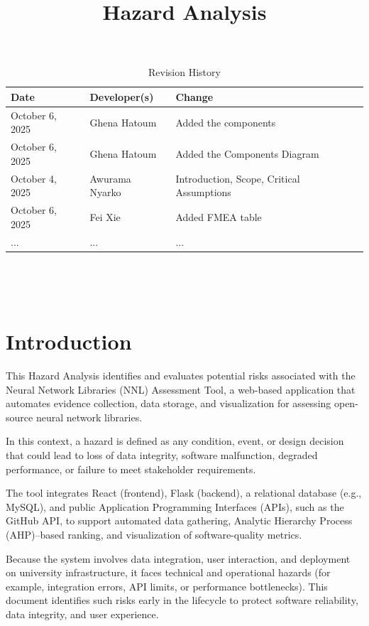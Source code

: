 \documentclass{article}
\title{Hazard Analysis\\\progname}
\author{\authname}
\date{}
\begin{document}
\maketitle
\thispagestyle{empty}


\begin{table}[hp]
\caption{Revision History} \label{TblRevisionHistory}
\begin{tabularx}{\textwidth}{llX}
\toprule
\textbf{Date} & \textbf{Developer(s)} & \textbf{Change}\\
\midrule
October 6, 2025  & Ghena Hatoum & Added the components\\
October 6, 2025  & Ghena Hatoum & Added the Components Diagram\\
October 4, 2025 & Awurama Nyarko & Introduction, Scope, Critical Assumptions\\
October 6, 2025 & Fei Xie & Added FMEA table\\
... & ... & ...\\
\bottomrule
\end{tabularx}
\end{table}

~\newpage

\tableofcontents

~\newpage


\section{Introduction}


This Hazard Analysis identifies and evaluates potential risks associated with
the Neural Network Libraries (NNL) Assessment Tool, a web-based application that
automates evidence collection, data storage, and visualization for assessing
open-source neural network libraries. 

In this context, a hazard is defined as any condition, event, or design
decision that could lead to loss of data integrity, software malfunction,
degraded performance, or failure to meet stakeholder requirements.

The tool integrates React (frontend), Flask (backend), a relational database
(e.g., MySQL), and public Application Programming Interfaces (APIs), such as the
GitHub API, to support automated data gathering, Analytic Hierarchy Process
(AHP)--based ranking, and visualization of software-quality metrics.

Because the system involves data integration, user interaction, and deployment
on university infrastructure, it faces technical and operational hazards (for
example, integration errors, API limits, or performance bottlenecks). This
document identifies such risks early in the lifecycle to protect software
reliability, data integrity, and user experience.
\end{document}
